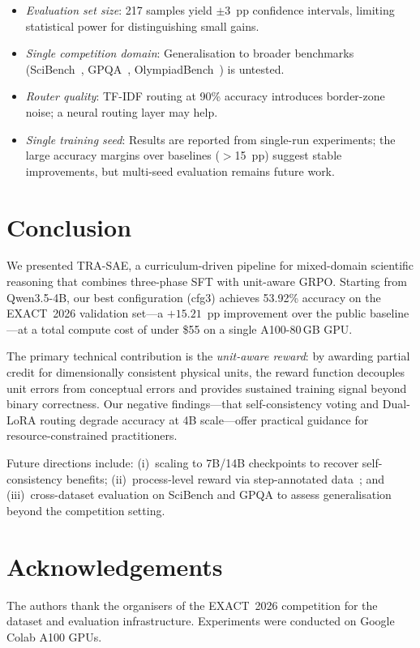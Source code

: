 \documentclass{ieeeaccess}
\newcommand{\modelname}{\textsc{TRA-SAE}}
\newcommand{\basemodelname}{Qwen3.5-4B}
\newcommand{\dataset}{EXACT~2026}
\begin{document}
\begin{itemize}
  \item \emph{Evaluation set size}: 217 samples yield $\pm 3$~pp
        confidence intervals, limiting statistical power for
        distinguishing small gains.
  \item \emph{Single competition domain}: Generalisation to broader
        benchmarks (SciBench~\cite{Wang2024scibench},
        GPQA~\cite{Rein2023}, OlympiadBench~\cite{He2024}) is untested.
  \item \emph{Router quality}: TF-IDF routing at 90\% accuracy
        introduces border-zone noise; a neural routing layer may help.
  \item \emph{Single training seed}: Results are reported from single-run
        experiments; the large accuracy margins over baselines
        ($>$15~pp) suggest stable improvements, but multi-seed
        evaluation remains future work.
\end{itemize}

\section{Conclusion}
\label{sec:conclusion}

We presented \modelname{}, a curriculum-driven pipeline for
mixed-domain scientific reasoning that combines three-phase SFT
with unit-aware GRPO.
Starting from \basemodelname{}, our best configuration (cfg3) achieves
53.92\% accuracy on the \dataset{} validation set---a $+15.21$~pp
improvement over the public baseline---at a total compute cost
of under \$55 on a single A100-80\,GB GPU.

The primary technical contribution is the \emph{unit-aware reward}:
by awarding partial credit for dimensionally consistent physical units,
the reward function decouples unit errors from conceptual errors and
provides sustained training signal beyond binary correctness.
Our negative findings---that self-consistency voting and Dual-LoRA
routing degrade accuracy at 4B scale---offer practical guidance for
resource-constrained practitioners.

Future directions include: (i)~scaling to 7B/14B checkpoints to
recover self-consistency benefits; (ii)~process-level reward via
step-annotated data~\cite{Lightman2023,Wang2024mathshepherd};
and (iii)~cross-dataset evaluation on SciBench and GPQA to assess
generalisation beyond the competition setting.

\section*{Acknowledgements}
The authors thank the organisers of the \dataset{} competition
for the dataset and evaluation infrastructure.
Experiments were conducted on Google Colab A100 GPUs.



\end{document}
